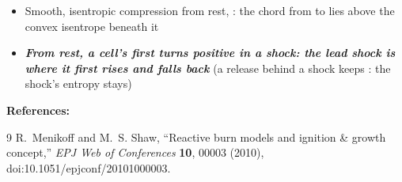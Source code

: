 \documentclass[11pt,addpoints]{exam}
\begin{document}
\begin{tcolorbox}[breakable]
\begin{itemize}
\item Smooth, isentropic compression from rest, \hspace{3mm} : \hspace{2mm} the chord from  to  lies above the convex isentrope beneath it\vspace{.5em}
\item \textbf{\emph{From rest, a cell's  first turns positive in a shock: the lead shock is where it first rises and falls back}} \hspace{3mm} (a release behind a shock keeps : the shock's entropy stays)
\end{itemize}
\end{tcolorbox}


\clearpage

\begin{tcolorbox}[breakable]
\textbf{References:}\vspace{.5em}

\begingroup
\renewcommand{\section}[2]{}%
\begin{thebibliography}{9}
\setlength{\itemsep}{0.25em}
R.~Menikoff and M.~S. Shaw, ``Reactive burn models and ignition \& growth concept,'' \emph{EPJ Web of Conferences} \textbf{10}, 00003 (2010), doi:10.1051/epjconf/20101000003.
\end{thebibliography}
\endgroup
\end{tcolorbox}
\end{document}

